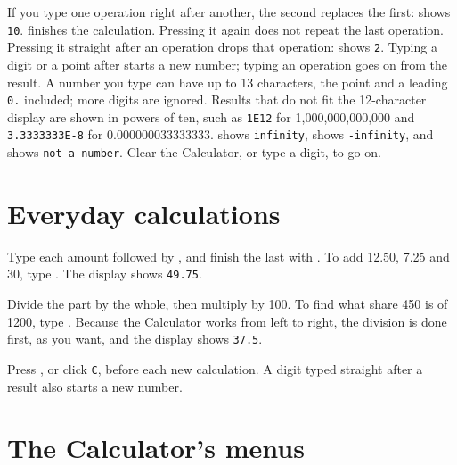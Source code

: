 
If you type one operation right after another,
the second replaces the first:  shows \texttt{10}.
\key{=} finishes the calculation.  Pressing it
again does not repeat the last operation.  Pressing it straight after an
operation drops that operation:  shows \texttt{2}.
Typing a digit or a point after \key{=} starts a
new number; typing an operation goes on from the result.
A number you type can have up to 13 characters,
the point and a leading \texttt{0.} included; more digits are ignored.
Results that do not fit the 12-character display are shown in powers of
ten, such as \texttt{1E12} for 1,000,000,000,000 and \texttt{3.3333333E-8}
for 0.000000033333333.
 shows \texttt{infinity},
 shows \texttt{-infinity}, and  shows \texttt{not a
number}.  Clear the Calculator, or type a digit, to go on.


\section{Everyday calculations}
Type each amount followed by \key{+}, and finish
the last with \key{=}.  To add 12.50, 7.25 and 30, type
.  The display shows \texttt{49.75}.


Divide the part by the whole, then
multiply by 100.  To find what share 450 is of 1200, type
.  Because the Calculator works from left to right, the
division is done first, as you want, and the display shows \texttt{37.5}.


Press , or click \texttt{C}, before each
new calculation.  A digit typed straight after a result also starts a new
number.

\section{The Calculator's menus}
